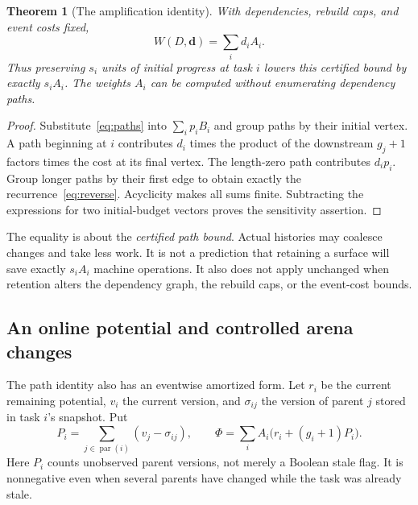 \documentclass[11pt]{article}
\newtheorem{theorem}{Theorem}[section]
\theoremstyle{definition}
\newcommand{\parents}{\operatorname{par}}
\begin{document}
\begin{theorem}[The amplification identity]\label{thm:reverse}
With dependencies, rebuild caps, and event costs fixed,
\begin{equation}\label{eq:work}
 W(D,\boldsymbol d)=\sum_i d_iA_i.
\end{equation}
Thus preserving $s_i$ units of initial progress at task $i$ lowers this certified bound by exactly $s_iA_i$. The weights $A_i$ can be computed without enumerating dependency paths.
\end{theorem}
\begin{proof}
Substitute~\eqref{eq:paths} into $\sum_i p_iB_i$ and group paths by their initial vertex. A path beginning at $i$ contributes $d_i$ times the product of the downstream $g_j+1$ factors times the cost at its final vertex. The length-zero path contributes $d_ip_i$. Group longer paths by their first edge to obtain exactly the recurrence~\eqref{eq:reverse}. Acyclicity makes all sums finite. Subtracting the expressions for two initial-budget vectors proves the sensitivity assertion.
\end{proof}

The equality is about the \emph{certified path bound}. Actual histories may coalesce changes and take less work. It is not a prediction that retaining a surface will save exactly $s_iA_i$ machine operations. It also does not apply unchanged when retention alters the dependency graph, the rebuild caps, or the event-cost bounds.

\subsection{An online potential and controlled arena changes}
The path identity also has an eventwise amortized form. Let $r_i$ be the current remaining potential, $v_i$ the current version, and $\sigma_{ij}$ the version of parent $j$ stored in task $i$'s snapshot. Put
\[
 P_i=\sum_{j\in\parents(i)}(v_j-\sigma_{ij}),
 \qquad
 \Phi=\sum_i A_i\bigl(r_i+(g_i+1)P_i\bigr).
\]
Here $P_i$ counts unobserved parent versions, not merely a Boolean stale flag. It is nonnegative even when several parents have changed while the task was already stale.
\end{document}
